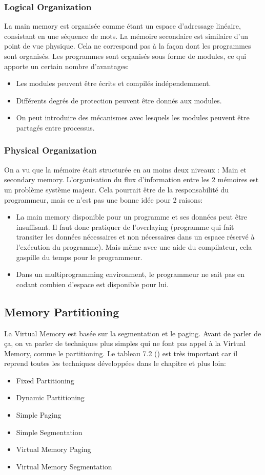 \subsubsection{Logical Organization}
La main memory est organisée comme étant un espace d'adressage linéaire, consistant en une séquence de mots.
La mémoire secondaire est similaire d'un point de vue physique.
Cela ne correspond pas à la façon dont les programmes sont organisés.
Les programmes sont organisés sous forme de modules, ce qui apporte un certain nombre d'avantages:
\begin{itemize}
  \item Les modules peuvent être écrits et compilés indépendemment.
  \item Différents degrés de protection peuvent être donnés aux modules.
  \item On peut introduire des mécanismes avec lesquels les modules peuvent être partagés entre processus.
\end{itemize}

\subsubsection{Physical Organization}
On a vu que la mémoire était structurée en au moins deux niveaux : Main et secondary memory.
L'organisation du flux d'information entre les 2 mémoires est un problème système majeur.
Cela pourrait être de la responsabilité du programmeur, mais ce n'est pas une bonne idée pour 2 raisons:
\begin{itemize}
  \item La main memory disponible pour un programme et ses données peut être insuffisant.
    Il faut donc pratiquer de l'overlaying
    (programme qui fait transiter les données nécessaires et non nécessaires dans un espace réservé à l'exécution du programme).
    Mais même avec une aide du compilateur, cela gaspille du temps pour le programmeur.
  \item Dans un multiprogramming environment,
    le programmeur ne sait pas en codant combien d'espace est disponible pour lui.
\end{itemize}

\subsection{Memory Partitioning}
La Virtual Memory est basée sur la segmentation et le paging.
Avant de parler de ça, on va parler de techniques plus simples qui ne font pas appel à la Virtual Memory, comme le partitioning.
Le tableau 7.2 (\cite[p.~331]{stallings}) est très important car il reprend toutes les techniques développées dans le chapitre et plus loin:
\begin{itemize}
  \item Fixed Partitioning
  \item Dynamic Partitioning
  \item Simple Paging
  \item Simple Segmentation
  \item Virtual Memory Paging
  \item Virtual Memory Segmentation
\end{itemize}

